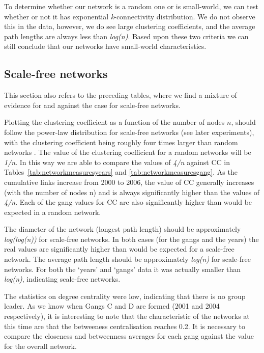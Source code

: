 \documentclass[conference]{IEEEtran}
\theoremstyle{definition}
\begin{document}
To determine whether our network is a random one or is small-world, we
can test whether or not it has exponential \emph{k}-connectivity
distribution. We do not observe this in the data, however, we do see
large clustering coefficients, and the average path lengths are always
less than {\emph{log(n)}}. Based upon these two criteria we can still
conclude that our networks have small-world characteristics.


\subsection{Scale-free networks}\label{sec:scalefree}
This section also refers to the preceding tables, where we find a
mixture of evidence for and against the case for scale-free networks.

Plotting the clustering coefficient as a function of the number of
nodes $n$, should follow the power-law distribution for scale-free
networks (see later experiments), with the clustering coefficient
being roughly four times larger than random networks
\cite{AlbAlbNak04}. The value of the clustering coefficient for a
random networks will be \emph{1/n}. In this way we are able to compare
the values of \emph{4/n} against CC in
Tables~\ref{tab:networkmeasuresyears} and
\ref{tab:networkmeasuresgang}. As the cumulative links increase from
2000 to 2006, the value of CC generally increases (with the number of
nodes n) and is always significantly higher than the values of
\emph{4/n}. Each of the gang values for CC are also significantly
higher than would be expected in a random network.

The diameter of the network (longest path length) should be
approximately \emph{log(log(n))} for scale-free networks. In both
cases (for the gangs and the years) the real values are significantly
higher than would be expected for a scale-free network. The average
path length should be approximately \emph{log(n)} for scale-free
networks. For both the `years' and `gangs' data it was actually
smaller than \emph{log(n)}, indicating scale-free networks.

The statistics on degree centrality were low, indicating that there is
no group leader. As we know when Gangs C and D are formed (2001
and 2004 respectively), it is interesting to note that the
characteristic of the networks at this time are that the betweeness
centralisation reaches 0.2. It is necessary to compare the closeness and
betweenness averages for each gang against the value for the overall
network.
\end{document}
